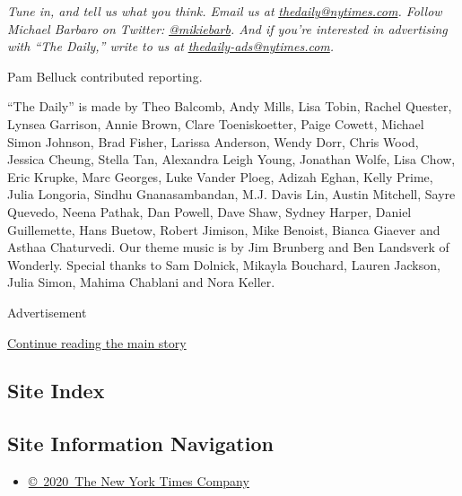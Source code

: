 \emph{Tune in, and tell us what you think. Email us at}
\href{mailto:thedaily@nytimes.com}{\emph{thedaily@nytimes.com}}\emph{.
Follow Michael Barbaro on Twitter:}
\href{https://twitter.com/mikiebarb}{\emph{@mikiebarb}}\emph{. And if
you're interested in advertising with ``The Daily,'' write to us at}
\href{mailto:thedaily-ads@nytimes.com}{\emph{thedaily-ads@nytimes.com}}\emph{.}

Pam Belluck contributed reporting.

``The Daily'' is made by Theo Balcomb, Andy Mills, Lisa Tobin, Rachel
Quester, Lynsea Garrison, Annie Brown, Clare Toeniskoetter, Paige
Cowett, Michael Simon Johnson, Brad Fisher, Larissa Anderson, Wendy
Dorr, Chris Wood, Jessica Cheung, Stella Tan, Alexandra Leigh Young,
Jonathan Wolfe, Lisa Chow, Eric Krupke, Marc Georges, Luke Vander Ploeg,
Adizah Eghan, Kelly Prime, Julia Longoria, Sindhu Gnanasambandan, M.J.
Davis Lin, Austin Mitchell, Sayre Quevedo, Neena Pathak, Dan Powell,
Dave Shaw, Sydney Harper, Daniel Guillemette, Hans Buetow, Robert
Jimison, Mike Benoist, Bianca Giaever and Asthaa Chaturvedi. Our theme
music is by Jim Brunberg and Ben Landsverk of Wonderly. Special thanks
to Sam Dolnick, Mikayla Bouchard, Lauren Jackson, Julia Simon, Mahima
Chablani and Nora Keller.

Advertisement

\protect\hyperlink{after-bottom}{Continue reading the main story}

\hypertarget{site-index}{%
\subsection{Site Index}\label{site-index}}

\hypertarget{site-information-navigation}{%
\subsection{Site Information
Navigation}\label{site-information-navigation}}

\begin{itemize}
\tightlist
\item
  \href{https://help.nytimes.com/hc/en-us/articles/115014792127-Copyright-notice}{©~2020~The
  New York Times Company}
\end{itemize}

